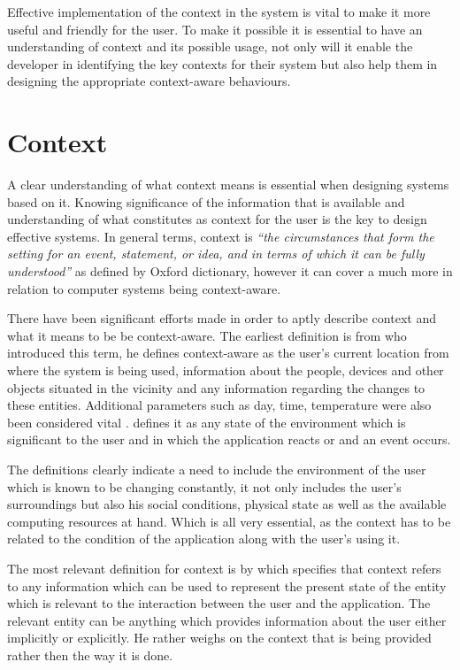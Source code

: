 \documentclass[12pt]{report}
\begin{document}
Effective implementation of the context in the system is vital to make it more useful and friendly for the user. To make it possible it is essential to have an understanding of context and its possible usage, not only will it enable the developer in identifying the key contexts for their system but also help them in designing the appropriate context-aware behaviours.

\noindent

\section{Context}
A clear understanding of what context means is essential when designing systems based on it. Knowing significance of the information that is available and understanding of what constitutes as context for the user is the key to design effective systems. In general terms, context is \textit{``the circumstances that form the setting for an event, statement, or idea, and in terms of which it can be fully understood''} as defined by Oxford dictionary, however it can cover a much more in relation to computer systems being context-aware. 

There have been significant efforts made in order to aptly describe context and what it means to be be context-aware. The earliest definition is from \cite{schilit1994context} who introduced this term, he defines context-aware as the user's current location from where the system is being used, information about the people, devices and other objects situated in the vicinity and any information regarding the changes to these entities. Additional parameters such as day, time, temperature were also been considered vital \cite{brown1996supporting}. \cite{prekop2003activities} defines it as any state of the environment which is significant to the user and in which the application reacts or and an event occurs. 


The definitions clearly indicate a need to include the environment of the user which is known to be changing constantly, it not only includes the user's surroundings but also his social conditions, physical state as well as the available computing resources at hand. Which is all very essential, as the context has to be related to the condition of the application along with the user's using it.


The most relevant definition for context is by \cite{dey2001understanding} which specifies that context refers to any information which can be used to represent the present state of the entity which is relevant to the interaction between the user and the application. The relevant entity can be anything which provides information about the user either implicitly or explicitly. He rather weighs on the context that is being provided rather then the way it is done. 
\end{document}
